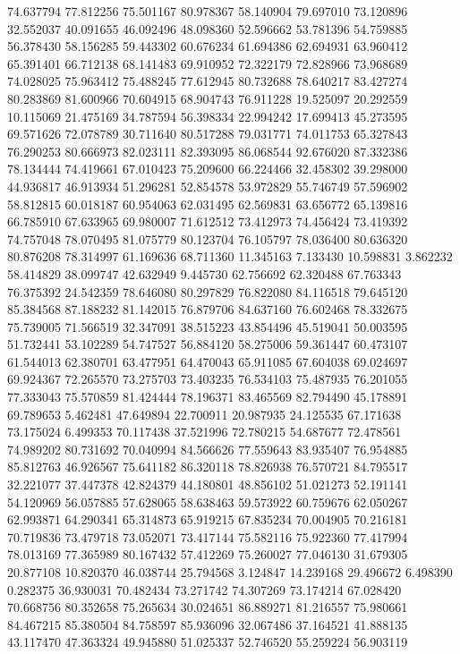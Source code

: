 74.637794
77.812256
75.501167
80.978367
58.140904
79.697010
73.120896
32.552037
40.091655
46.092496
48.098360
52.596662
53.781396
54.759885
56.378430
58.156285
59.443302
60.676234
61.694386
62.694931
63.960412
65.391401
66.712138
68.141483
69.910952
72.322179
72.828966
73.968689
74.028025
75.963412
75.488245
77.612945
80.732688
78.640217
83.427274
80.283869
81.600966
70.604915
68.904743
76.911228
19.525097
20.292559
10.115069
21.475169
34.787594
56.398334
22.994242
17.699413
45.273595
69.571626
72.078789
30.711640
80.517288
79.031771
74.011753
65.327843
76.290253
80.666973
82.023111
82.393095
86.068544
92.676020
87.332386
78.134444
74.419661
67.010423
75.209600
66.224466
32.458302
39.298000
44.936817
46.913934
51.296281
52.854578
53.972829
55.746749
57.596902
58.812815
60.018187
60.954063
62.031495
62.569831
63.656772
65.139816
66.785910
67.633965
69.980007
71.612512
73.412973
74.456424
73.419392
74.757048
78.070495
81.075779
80.123704
76.105797
78.036400
80.636320
80.876208
78.314997
61.169636
68.711360
11.345163
7.133430
10.598831
3.862232
58.414829
38.099747
42.632949
9.445730
62.756692
62.320488
67.763343
76.375392
24.542359
78.646080
80.297829
76.822080
84.116518
79.645120
85.384568
87.188232
81.142015
76.879706
84.637160
76.602468
78.332675
75.739005
71.566519
32.347091
38.515223
43.854496
45.519041
50.003595
51.732441
53.102289
54.747527
56.884120
58.275006
59.361447
60.473107
61.544013
62.380701
63.477951
64.470043
65.911085
67.604038
69.024697
69.924367
72.265570
73.275703
73.403235
76.534103
75.487935
76.201055
77.333043
75.570859
81.424444
78.196371
83.465569
82.794490
45.178891
69.789653
5.462481
47.649894
22.700911
20.987935
24.125535
67.171638
73.175024
6.499353
70.117438
37.521996
72.780215
54.687677
72.478561
74.989202
80.731692
70.040994
84.566626
77.559643
83.935407
76.954885
85.812763
46.926567
75.641182
86.320118
78.826938
76.570721
84.795517
32.221077
37.447378
42.824379
44.180801
48.856102
51.021273
52.191141
54.120969
56.057885
57.628065
58.638463
59.573922
60.759676
62.050267
62.993871
64.290341
65.314873
65.919215
67.835234
70.004905
70.216181
70.719836
73.479718
73.052071
73.417144
75.582116
75.922360
77.417994
78.013169
77.365989
80.167432
57.412269
75.260027
77.046130
31.679305
20.877108
10.820370
46.038744
25.794568
3.124847
14.239168
29.496672
6.498390
0.282375
36.930031
70.482434
73.271742
74.307269
73.174214
67.028420
70.668756
80.352658
75.265634
30.024651
86.889271
81.216557
75.980661
84.467215
85.380504
84.758597
85.936096
32.067486
37.164521
41.888135
43.117470
47.363324
49.945880
51.025337
52.746520
55.259224
56.903119
